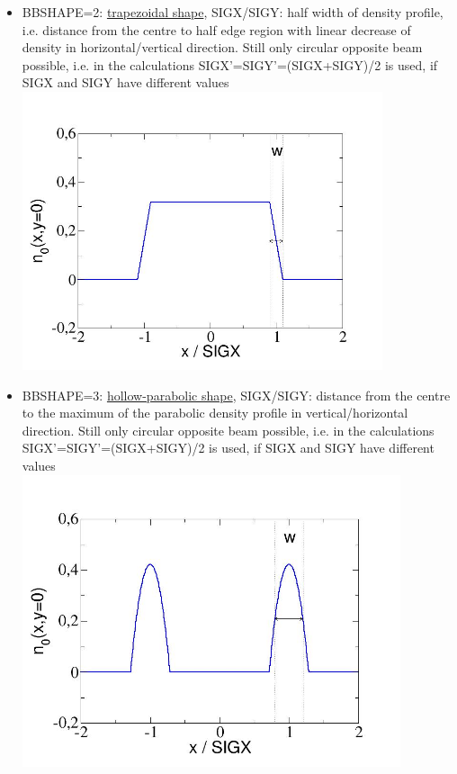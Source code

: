 \begin{itemize}
\begin{itemize}
	\item  BBSHAPE=2: \href{beambeam_n_trapez.jpg}{trapezoidal shape}, 
 SIGX/SIGY: half width of density profile, 
 i.e. distance from the centre to half edge region with linear decrease of 
 density in horizontal/vertical direction. Still only circular opposite beam 
 possible, i.e. in the calculations 
 SIGX'=SIGY'=(SIGX+SIGY)/2 is used, if SIGX and SIGY have different values 
\\
\includegraphics[width=400px]{Introduction/beambeam_n_trapez.jpg}%
\\
	\item  BBSHAPE=3: \href{beambeam_n_hollowparabol.jpg}{hollow-parabolic shape}, 
 SIGX/SIGY: distance from the centre 
 to the maximum of the parabolic density profile in vertical/horizontal 
 direction. Still only circular opposite beam possible, 
 i.e. in the calculations 
 SIGX'=SIGY'=(SIGX+SIGY)/2 is used, if SIGX and SIGY have different values 
 \\
\includegraphics[width=420px]{Introduction/beambeam_n_hollowparabol.jpg}%

\end{itemize}
\end{itemize}

